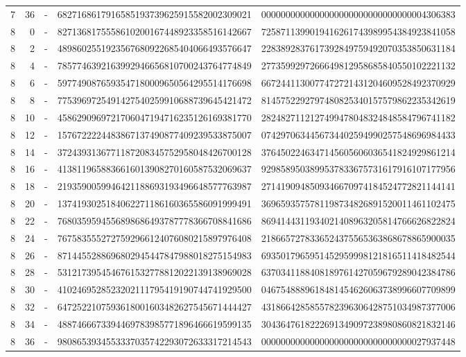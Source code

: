 \begin{longtable}{rrrll}
7 & 36 & - & 6827168617916585193739625915582002309021 & 0000000000000000000000000000000004306383 \\
8 & 0 & - & 8271368175558610200167448923358516142667 & 7258711399019416261743989954384923841058 \\
8 & 2 & - & 4898602551923567680922685404066493576647 & 2283892837617392849759492070353850631184 \\
8 & 4 & - & 7857746392163992946656810700243764774849 & 2773599297266649812958685840550102221132 \\
8 & 6 & - & 5977490876593547180009650564295514176698 & 6672441130077472721431204609528492370929 \\
8 & 8 & - & 7753969725491427540259910688739645421472 & 8145752292797480825340157579862235342619 \\
8 & 10 & - & 4586290969721706047194716235126169381770 & 2824827112127499478048324848584796741182 \\
8 & 12 & - & 1576722224483867137490877409239533875007 & 0742970634456734402594990257548696984433 \\
8 & 14 & - & 3724393136771187208345752958048426700128 & 3764502246347145605606036541824929861214 \\
8 & 16 & - & 4138119658836616013908270160587532069637 & 9298589503899537833675731617916107177956 \\
8 & 18 & - & 2193590059946421188693193496648577763987 & 2714190948509346670974184524772821144141 \\
8 & 20 & - & 1374193025184062271186160365586091999491 & 3696593575781198734826891520011461102475 \\
8 & 22 & - & 7680359594556898686493787778366708841686 & 8694144311934021408963205814766626822824 \\
8 & 24 & - & 7675835552727592966124076080215897976408 & 2186657278336524375565363868678865900035 \\
8 & 26 & - & 8714455288696802945447847988018275154983 & 6935017965951452959998121816511418482544 \\
8 & 28 & - & 5312173954546761532778812022139138969028 & 6370341188408189761427059679289042384786 \\
8 & 30 & - & 4102469528523202111795419190744741929500 & 0467548889618481454626063738996607709899 \\
8 & 32 & - & 6472522107593618001603482627545671444427 & 4318664285855782396306428751034987377006 \\
8 & 34 & - & 4887466673394469783985771896466619599135 & 3043647618222691349097238980860821832146 \\
8 & 36 & - & 9808653934553337035742293072633317214543 & 0000000000000000000000000000000027937448 \\
\end{longtable}
